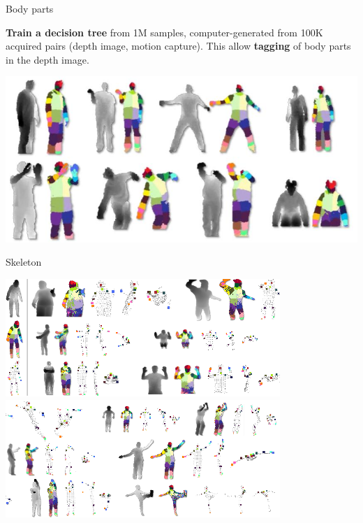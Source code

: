 \documentclass[compress]{beamer}
\begin{document}
{

\begin{frame}{Body parts}

    {\bf Train a decision tree} from \approx 1M samples, computer-generated from
    \approx 100K acquired pairs (depth image, motion capture). This allow
    {\bf tagging} of body parts in the depth image.

    \begin{center}
        \includegraphics[width=0.8\linewidth]{skeleton/training}
    \end{center}
\end{frame}
}

\begin{frame}{Skeleton}
    \begin{center}
        \includegraphics[width=0.8\linewidth]{skeleton/skel4}\\
        \includegraphics[width=0.8\linewidth]{skeleton/skel5}
    \end{center}
\end{frame}
\end{document}

